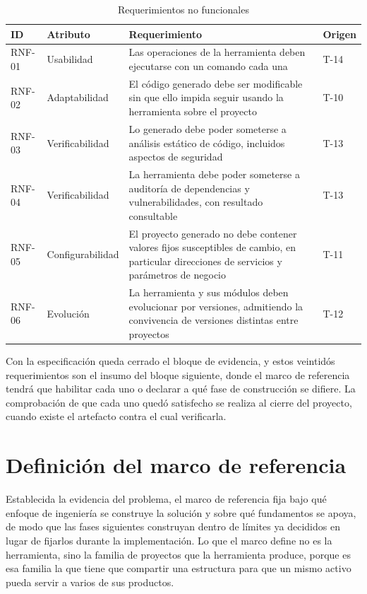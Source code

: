 \begin{table}[H]
\centering
{\footnotesize
\begin{tabular}{p{1.4cm}p{2.9cm}p{8.9cm}p{1.3cm}}
\toprule
\textbf{ID} & \textbf{Atributo} & \textbf{Requerimiento} & \textbf{Origen} \\
\midrule
RNF-01 & Usabilidad & Las operaciones de la herramienta deben ejecutarse con un comando cada una & T-14 \\
RNF-02 & Adaptabilidad & El código generado debe ser modificable sin que ello impida seguir usando la herramienta sobre el proyecto & T-10 \\
RNF-03 & Verificabilidad & Lo generado debe poder someterse a análisis estático de código, incluidos aspectos de seguridad & T-13 \\
RNF-04 & Verificabilidad & La herramienta debe poder someterse a auditoría de dependencias y vulnerabilidades, con resultado consultable & T-13 \\
RNF-05 & Configurabilidad & El proyecto generado no debe contener valores fijos susceptibles de cambio, en particular direcciones de servicios y parámetros de negocio & T-11 \\
RNF-06 & Evolución & La herramienta y sus módulos deben evolucionar por versiones, admitiendo la convivencia de versiones distintas entre proyectos & T-12 \\
\bottomrule
\end{tabular}
}
\caption{Requerimientos no funcionales}
\label{tab:rnf}
\end{table}

Con la especificación queda cerrado el bloque de evidencia, y estos veintidós
requerimientos son el insumo del bloque siguiente, donde el marco de
referencia tendrá que habilitar cada uno o declarar a qué fase de
construcción se difiere. La comprobación de que cada uno quedó satisfecho se
realiza al cierre del proyecto, cuando existe el artefacto contra el cual
verificarla.

\section{Definición del marco de referencia}
\label{sec:marco-tecnico-solucion}

Establecida la evidencia del problema, el marco de referencia fija bajo qué
enfoque de ingeniería se construye la solución y sobre qué fundamentos se
apoya, de modo que las fases siguientes construyan dentro de límites ya
decididos en lugar de fijarlos durante la implementación. Lo que el marco
define no es la herramienta, sino la familia de proyectos que la herramienta
produce, porque es esa familia la que tiene que compartir una estructura para
que un mismo activo pueda servir a varios de sus productos.

